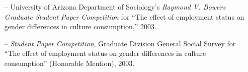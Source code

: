 \begin{itemize}[itemsep=0.5ex]
\item[--] University of Arizona Department of Sociology's  {\em Raymond V. Bowers Graduate Student Paper Competition} for ``The effect of employment status on gender differences in culture consumption,'' 2003.

\item[--] {\em Student Paper Competition}, Graduate Division General Social Survey for ``The effect of employment status on gender differences in culture consumption'' (Honorable Mention), 2003.
\end{itemize}